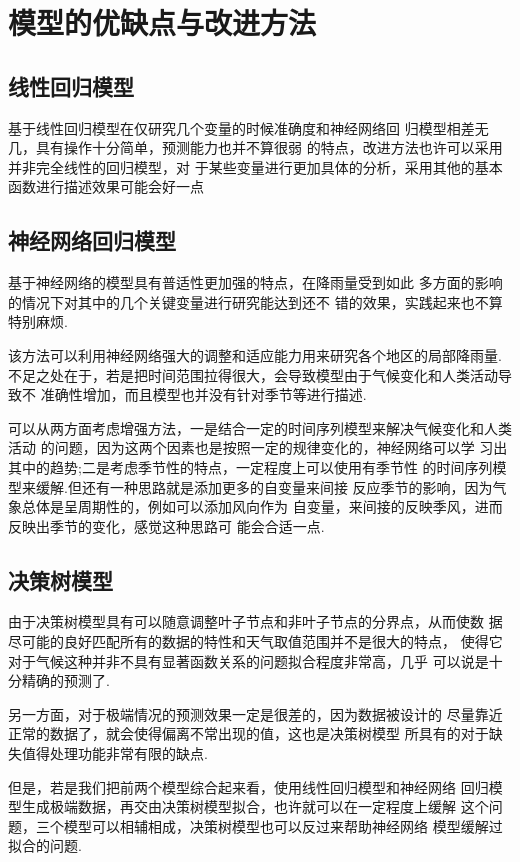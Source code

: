 \documentclass[UTF8, a4paper]{ctexart}
\begin{document}
\section{模型的优缺点与改进方法}

\subsection{线性回归模型}
基于线性回归模型在仅研究几个变量的时候准确度和神经网络回
归模型相差无几，具有操作十分简单，预测能力也并不算很弱
的特点，改进方法也许可以采用并非完全线性的回归模型，对
于某些变量进行更加具体的分析，采用其他的基本函数进行描述效果可能会好一点

\subsection{神经网络回归模型}
基于神经网络的模型具有普适性更加强的特点，在降雨量受到如此
多方面的影响的情况下对其中的几个关键变量进行研究能达到还不
错的效果，实践起来也不算特别麻烦.

该方法可以利用神经网络强大的调整和适应能力用来研究各个地区的局部降雨量.
不足之处在于，若是把时间范围拉得很大，会导致模型由于气候变化和人类活动导致不
准确性增加，而且模型也并没有针对季节等进行描述.

可以从两方面考虑增强方法，一是结合一定的时间序列模型来解决气候变化和人类活动
的问题，因为这两个因素也是按照一定的规律变化的，神经网络可以学
习出其中的趋势;二是考虑季节性的特点，一定程度上可以使用有季节性
的时间序列模型来缓解.但还有一种思路就是添加更多的自变量来间接
反应季节的影响，因为气象总体是呈周期性的，例如可以添加风向作为
自变量，来间接的反映季风，进而反映出季节的变化，感觉这种思路可
能会合适一点.

\subsection{决策树模型}
由于决策树模型具有可以随意调整叶子节点和非叶子节点的分界点，从而使数
据尽可能的良好匹配所有的数据的特性和天气取值范围并不是很大的特点，
使得它对于气候这种并非不具有显著函数关系的问题拟合程度非常高，几乎
可以说是十分精确的预测了.

另一方面，对于极端情况的预测效果一定是很差的，因为数据被设计的
尽量靠近正常的数据了，就会使得偏离不常出现的值，这也是决策树模型
所具有的对于缺失值得处理功能非常有限的缺点.

但是，若是我们把前两个模型综合起来看，使用线性回归模型和神经网络
回归模型生成极端数据，再交由决策树模型拟合，也许就可以在一定程度上缓解
这个问题，三个模型可以相辅相成，决策树模型也可以反过来帮助神经网络
模型缓解过拟合的问题.
\end{document}
